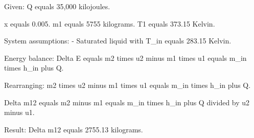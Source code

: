 Given:  
Q equals 35,000 kilojoules.  

x equals 0.005.  
m1 equals 5755 kilograms.  
T1 equals 373.15 Kelvin.  

System assumptions:  
- Saturated liquid with T_in equals 283.15 Kelvin.  

Energy balance:  
Delta E equals m2 times u2 minus m1 times u1 equals m_in times h_in plus Q.  

Rearranging:  
m2 times u2 minus m1 times u1 equals m_in times h_in plus Q.  

Delta m12 equals m2 minus m1 equals m_in times h_in plus Q divided by u2 minus u1.  

Result:  
Delta m12 equals 2755.13 kilograms.
